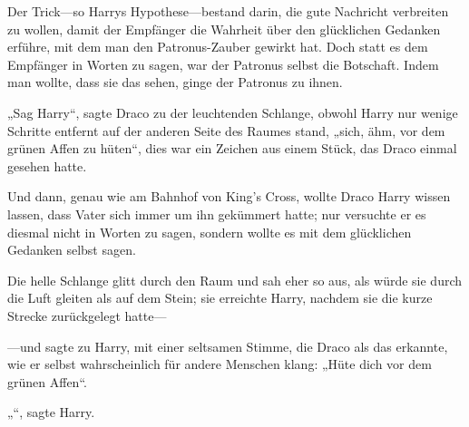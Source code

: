 Der Trick—so Harrys Hypothese—bestand darin, die gute Nachricht verbreiten zu wollen, damit der Empfänger die Wahrheit über den glücklichen Gedanken erführe, mit dem man den Patronus-Zauber gewirkt hat. Doch statt es dem Empfänger in Worten zu sagen, war der Patronus selbst die Botschaft. Indem man wollte, dass sie das sehen, ginge der Patronus zu ihnen.

„Sag Harry“, sagte Draco zu der leuchtenden Schlange, obwohl Harry nur wenige Schritte entfernt auf der anderen Seite des Raumes stand, „sich, ähm, vor dem grünen Affen zu hüten“, dies war ein Zeichen aus einem Stück, das Draco einmal gesehen hatte.

Und dann, genau wie am Bahnhof von King’s Cross, wollte Draco Harry wissen lassen, dass Vater sich immer um ihn gekümmert hatte; nur versuchte er es diesmal nicht in Worten zu sagen, sondern wollte es mit dem glücklichen Gedanken selbst sagen.

Die helle Schlange glitt durch den Raum und sah eher so aus, als würde sie durch die Luft gleiten als auf dem Stein; sie erreichte Harry, nachdem sie die kurze Strecke zurückgelegt hatte—

—und sagte zu Harry, mit einer seltsamen Stimme, die Draco als das erkannte, wie er selbst wahrscheinlich für andere Menschen klang: „Hüte dich vor dem grünen Affen“.

„“, sagte Harry.

